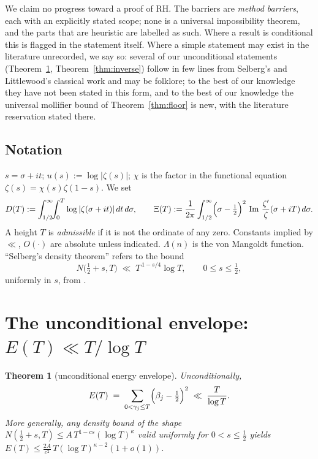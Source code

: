 \documentclass[11pt]{amsart}
\theoremstyle{plain}
\newtheorem{theorem}{Theorem}[section]
\theoremstyle{definition}
\theoremstyle{remark}
\newcommand{\RH}{\mathrm{RH}}
\newcommand{\Imm}{\operatorname{Im}}
\begin{document}
We claim no progress toward a proof of $\RH$. The barriers are \emph{method barriers}, each with an explicitly stated scope; none is a universal impossibility theorem, and the parts that are heuristic are labelled as such. Where a result is conditional this is flagged in the statement itself. Where a simple statement may exist in the literature unrecorded, we say so: several of our unconditional statements (Theorem~\ref{thm:envelope}, Theorem~\ref{thm:inverse}) follow in few lines from Selberg's and Littlewood's classical work and may be folklore; to the best of our knowledge they have not been stated in this form, and to the best of our knowledge the universal mollifier bound of Theorem~\ref{thm:floor} is new, with the literature reservation stated there.

\subsection{Notation}

$s=\sigma+it$; $u(s):=\log|\zeta(s)|$; $\chi$ is the factor in the functional equation $\zeta(s)=\chi(s)\zeta(1-s)$. We set
\[
D(T):=\int_{1/2}^{\infty}\!\!\int_0^T \log|\zeta(\sigma+it)|\,dt\,d\sigma,
\qquad
\Xi(T):=\frac{1}{2\pi}\int_{1/2}^\infty\Bigl(\sigma-\tfrac12\Bigr)^2\,\Imm\,\frac{\zeta'}{\zeta}(\sigma+iT)\,d\sigma .
\]
A height $T$ is \emph{admissible} if it is not the ordinate of any zero. Constants implied by $\ll$, $O(\cdot)$ are absolute unless indicated. $\Lambda(n)$ is the von Mangoldt function. ``Selberg's density theorem'' refers to the bound
\begin{equation}\label{eq:selberg}
N\bigl(\tfrac12+s,T\bigr)\;\ll\;T^{\,1-s/4}\log T,\qquad 0\le s\le\tfrac12,
\end{equation}
uniformly in $s$, from \cite{Selberg1946}.

\section{The unconditional envelope: $E(T)\ll T/\log T$}\label{sec:envelope}

\begin{theorem}[unconditional energy envelope]\label{thm:envelope}
Unconditionally,
\[
E(T)\;=\;\sum_{0<\gamma_j\le T}\Bigl(\beta_j-\tfrac12\Bigr)^2\;\ll\;\frac{T}{\log T}.
\]
More generally, any density bound of the shape $N(\tfrac12+s,T)\le A\,T^{1-cs}(\log T)^{\kappa}$ valid uniformly for $0<s\le\tfrac12$ yields $E(T)\le \frac{2A}{c^2}\,T(\log T)^{\kappa-2}(1+o(1))$.
\end{theorem}
\end{document}
